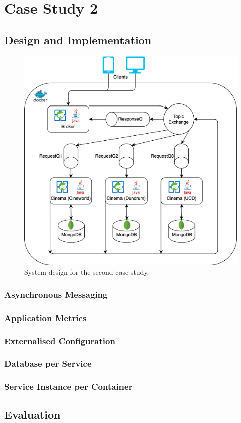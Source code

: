 \section{Case Study 2}



\subsection{Design and Implementation}

\begin{figure}[H]
  \centering
  \includegraphics[width=0.6\linewidth]{./assets/diagrams/cs02-arch.png}
  \caption{System design for the second case study.}
  \label{fig:cs02-arch}
\end{figure}

\subsubsection{Asynchronous Messaging}
\subsubsection{Application Metrics}
\subsubsection{Externalised Configuration}
\subsubsection{Database per Service}
\subsubsection{Service Instance per Container}

\subsection{Evaluation}
